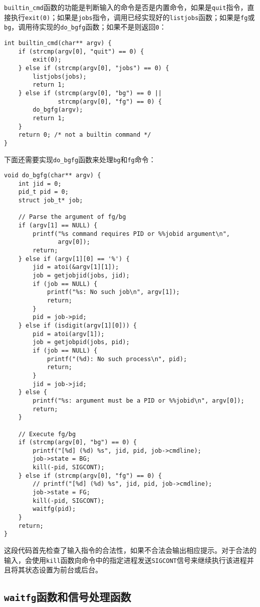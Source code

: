 \documentclass[a4paper, 11pt]{ctexart}
\begin{document}
\texttt{builtin\_cmd}函数的功能是判断输入的命令是否是内置命令，如果是\texttt{quit}指令，直接执行\texttt{exit(0)}；如果是\texttt{jobs}指令，调用已经实现好的\texttt{listjobs}函数；如果是\texttt{fg}或\texttt{bg}，调用待实现的\texttt{do\_bgfg}函数；如果不是则返回\texttt{0}：

\begin{verbatim}
int builtin_cmd(char** argv) {
    if (strcmp(argv[0], "quit") == 0) {
        exit(0);
    } else if (strcmp(argv[0], "jobs") == 0) {
        listjobs(jobs);
        return 1;
    } else if (strcmp(argv[0], "bg") == 0 ||
               strcmp(argv[0], "fg") == 0) {
        do_bgfg(argv);
        return 1;
    }
    return 0; /* not a builtin command */
}
\end{verbatim}

下面还需要实现\texttt{do\_bgfg}函数来处理\texttt{bg}和\texttt{fg}命令：

\begin{verbatim}
void do_bgfg(char** argv) {
    int jid = 0;
    pid_t pid = 0;
    struct job_t* job;

    // Parse the argument of fg/bg
    if (argv[1] == NULL) {
        printf("%s command requires PID or %%jobid argument\n",
               argv[0]);
        return;
    } else if (argv[1][0] == '%') {
        jid = atoi(&argv[1][1]);
        job = getjobjid(jobs, jid);
        if (job == NULL) {
            printf("%s: No such job\n", argv[1]);
            return;
        }
        pid = job->pid;
    } else if (isdigit(argv[1][0])) {
        pid = atoi(argv[1]);
        job = getjobpid(jobs, pid);
        if (job == NULL) {
            printf("(%d): No such process\n", pid);
            return;
        }
        jid = job->jid;
    } else {
        printf("%s: argument must be a PID or %%jobid\n", argv[0]);
        return;
    }

    // Execute fg/bg
    if (strcmp(argv[0], "bg") == 0) {
        printf("[%d] (%d) %s", jid, pid, job->cmdline);
        job->state = BG;
        kill(-pid, SIGCONT);
    } else if (strcmp(argv[0], "fg") == 0) {
        // printf("[%d] (%d) %s", jid, pid, job->cmdline);
        job->state = FG;
        kill(-pid, SIGCONT);
        waitfg(pid);
    }
    return;
}
\end{verbatim}

这段代码首先检查了输入指令的合法性，如果不合法会输出相应提示。对于合法的输入，会使用\texttt{kill}函数向命令中的指定进程发送\texttt{SIGCONT}信号来继续执行该进程并且将其状态设置为前台或后台。

\subsection{\texttt{waitfg}函数和信号处理函数}
\label{sec:signal_handlers}
\end{document}
